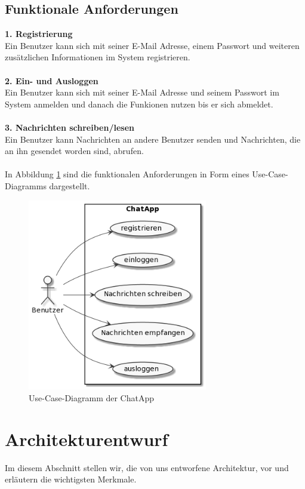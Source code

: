 \subsection{Funktionale Anforderungen}
\textbf{1. Registrierung}\\
Ein Benutzer kann sich mit seiner E-Mail Adresse, einem Passwort und weiteren zusätzlichen Informationen im System registrieren.\\
\\
\textbf{2. Ein- und Ausloggen}\\
Ein Benutzer kann sich mit seiner E-Mail Adresse und seinem Passwort im System anmelden und danach die Funkionen nutzen bis er sich abmeldet.\\
\\
\textbf{3. Nachrichten schreiben/lesen}\\
Ein Benutzer kann Nachrichten an andere Benutzer senden und Nachrichten, die an ihn gesendet worden sind, abrufen.\\
\\
In Abbildung \ref{use-case} sind die funktionalen Anforderungen in Form eines Use-Case-Diagramms dargestellt.
\begin{figure}[bth] 
	\centering
	\includegraphics[width=0.7\textwidth]{Graphics/Usecase-Diagramm.png}
	\caption{Use-Case-Diagramm der ChatApp}
	\label{use-case}
\end{figure}

\section{Architekturentwurf}
Im diesem Abschnitt stellen wir, die von uns entworfene Architektur, vor und erläutern die wichtigsten Merkmale.
